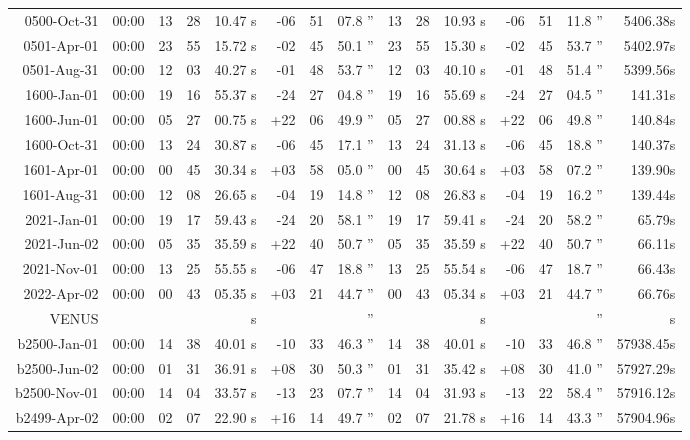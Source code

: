 \begin{longtable}{r@{\,}r|r@{h\,}r@{m\,}r<{s}|r@{°\,}r@{'\,}r<{''}||r@{h\,}r@{m\,}r<{s}|r@{°\,}r@{'\,}r<{''}r<{s}}
 0500-Oct-31 & 00:00  &   13 & 28 & 10.47 & -06 & 51 & 07.8 & 13&28&10.93 & -06&51&11.8 & 5406.38\\ %
 0501-Apr-01 & 00:00  &   23 & 55 & 15.72 & -02 & 45 & 50.1 & 23&55&15.30 & -02&45&53.7 & 5402.97\\ %
 0501-Aug-31 & 00:00  &   12 & 03 & 40.27 & -01 & 48 & 53.7 & 12&03&40.10 & -01&48&51.4 & 5399.56\\ %
 1600-Jan-01 & 00:00  &   19 & 16 & 55.37 & -24 & 27 & 04.8 & 19&16&55.69 & -24&27&04.5 & 141.31\\ %
 1600-Jun-01 & 00:00  &   05 & 27 & 00.75 & +22 & 06 & 49.9 & 05&27&00.88 & +22&06&49.8 & 140.84\\ %
 1600-Oct-31 & 00:00  &   13 & 24 & 30.87 & -06 & 45 & 17.1 & 13&24&31.13 & -06&45&18.8 & 140.37\\ %
 1601-Apr-01 & 00:00  &   00 & 45 & 30.34 & +03 & 58 & 05.0 & 00&45&30.64 & +03&58&07.2 & 139.90\\ %
 1601-Aug-31 & 00:00  &   12 & 08 & 26.65 & -04 & 19 & 14.8 & 12&08&26.83 & -04&19&16.2 & 139.44\\ %
 2021-Jan-01 & 00:00  &   19 & 17 & 59.43 & -24 & 20 & 58.1 & 19&17&59.41 & -24&20&58.2 & 65.79\\ %
 2021-Jun-02 & 00:00  &   05 & 35 & 35.59 & +22 & 40 & 50.7 & 05&35&35.59 & +22&40&50.7 & 66.11\\ %
 2021-Nov-01 & 00:00  &   13 & 25 & 55.55 & -06 & 47 & 18.8 & 13&25&55.54 & -06&47&18.7 & 66.43\\ %
 2022-Apr-02 & 00:00  &   00 & 43 & 05.35 & +03 & 21 & 44.7 & 00&43&05.34 & +03&21&44.7 & 66.76\\ %
VENUS    \\
b2500-Jan-01 & 00:00  &   14 & 38 & 40.01 & -10 & 33 & 46.3 & 14&38&40.01 & -10&33&46.8 & 57938.45\\ %
b2500-Jun-02 & 00:00  &   01 & 31 & 36.91 & +08 & 30 & 50.3 & 01&31&35.42 & +08&30&41.0 & 57927.29\\ %
b2500-Nov-01 & 00:00  &   14 & 04 & 33.57 & -13 & 23 & 07.7 & 14&04&31.93 & -13&22&58.4 & 57916.12\\ %
b2499-Apr-02 & 00:00  &   02 & 07 & 22.90 & +16 & 14 & 49.7 & 02&07&21.78 & +16&14&43.3 & 57904.96\\ %

\end{longtable}
